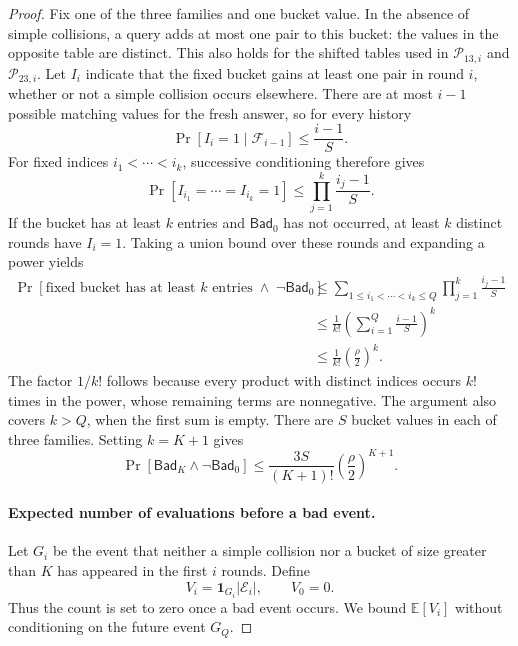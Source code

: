 \documentclass[11pt,letterpaper]{article}
\theoremstyle{definition} %
\begin{document}
\begin{proof}
Fix one of the three families and one bucket value. In the absence of
simple collisions, a query adds at most one pair to this bucket: the
values in the opposite table are distinct. This also holds for the
shifted tables used in $\mathcal{P}_{13,i}$ and
$\mathcal{P}_{23,i}$. Let $I_i$ indicate that the fixed bucket gains
at least one pair in round $i$, whether or not a simple collision occurs
elsewhere. There are at most $i-1$ possible matching values for the
fresh answer, so for every history
\[
 \Pr[I_i=1\mid\mathcal{F}_{i-1}]\leq\frac{i-1}{S}.
\]
For fixed indices $i_1<\cdots<i_k$, successive conditioning therefore
gives
\[
 \Pr[I_{i_1}=\cdots=I_{i_k}=1]
 \leq\prod_{j=1}^{k}\frac{i_j-1}{S}.
\]
If the bucket has at least $k$ entries and $\mathsf{Bad}_0$ has not
occurred, at least $k$ distinct rounds have $I_i=1$. Taking a union
bound over these rounds and expanding a power yields
\begin{align*}
 \Pr[\text{fixed bucket has at least $k$ entries}
          \;\wedge\;\neg\mathsf{Bad}_0]
 &\leq\sum_{1\leq i_1<\cdots<i_k\leq Q}
             \prod_{j=1}^{k}\frac{i_j-1}{S}\\
 &\leq\frac{1}{k!}
          \left(\sum_{i=1}^{Q}\frac{i-1}{S}\right)^k\\
 &\leq\frac{1}{k!}\left(\frac{\rho}{2}\right)^k.
\end{align*}
The factor $1/k!$ follows because every product with distinct indices
occurs $k!$ times in the power, whose remaining terms are nonnegative.
The argument also covers $k>Q$, when the first sum is empty. There are
$S$ bucket values in each of three families. Setting $k=K+1$ gives
\begin{equation}
 \Pr[\mathsf{Bad}_K\wedge\neg\mathsf{Bad}_0]
 \leq\frac{3S}{(K+1)!}
            \left(\frac{\rho}{2}\right)^{K+1}.
 \label{eq:t5-bucket-tail}
\end{equation}

\paragraph{Expected number of evaluations before a bad event.}
Let $G_i$ be the event that neither a simple collision nor a bucket of
size greater than $K$ has appeared in the first $i$ rounds. Define
\[
 V_i=\mathbf{1}_{G_i}|\mathcal{E}_i|,
 \qquad V_0=0.
\]
Thus the count is set to zero once a bad event occurs. We bound
$\mathbb{E}[V_i]$ without conditioning on the future event $G_Q$.


\end{proof}
\end{document}
